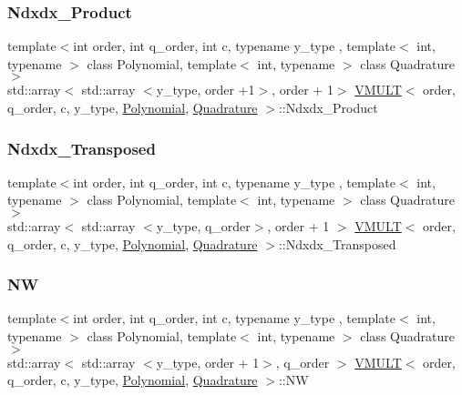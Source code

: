 \mbox{\label{class_v_m_u_l_t_a74d462b33c24fb447dc7267be3725720}} 
\subsubsection{\texorpdfstring{Ndxdx\+\_\+\+Product}{Ndxdx\_Product}}
{\footnotesize\ttfamily template$<$int order, int q\+\_\+order, int c, typename y\+\_\+type , template$<$ int, typename $>$ class Polynomial, template$<$ int, typename $>$ class Quadrature$>$ \\
std\+::array$<$ std\+::array $<$y\+\_\+type, order +1$>$, order + 1$>$ \hyperlink{class_v_m_u_l_t}{V\+M\+U\+LT}$<$ order, q\+\_\+order, c, y\+\_\+type, \hyperlink{class_polynomial}{Polynomial}, \hyperlink{class_quadrature}{Quadrature} $>$\+::Ndxdx\+\_\+\+Product}

\mbox{\label{class_v_m_u_l_t_a11fec13d3ecba614678ce07a466bdcb1}} 
\subsubsection{\texorpdfstring{Ndxdx\+\_\+\+Transposed}{Ndxdx\_Transposed}}
{\footnotesize\ttfamily template$<$int order, int q\+\_\+order, int c, typename y\+\_\+type , template$<$ int, typename $>$ class Polynomial, template$<$ int, typename $>$ class Quadrature$>$ \\
std\+::array$<$ std\+::array $<$y\+\_\+type, q\+\_\+order$>$, order + 1 $>$ \hyperlink{class_v_m_u_l_t}{V\+M\+U\+LT}$<$ order, q\+\_\+order, c, y\+\_\+type, \hyperlink{class_polynomial}{Polynomial}, \hyperlink{class_quadrature}{Quadrature} $>$\+::Ndxdx\+\_\+\+Transposed}

\mbox{\label{class_v_m_u_l_t_ad06ca1f3f261548524b59bd1a6dbe80d}} 
\subsubsection{\texorpdfstring{NW}{NW}}
{\footnotesize\ttfamily template$<$int order, int q\+\_\+order, int c, typename y\+\_\+type , template$<$ int, typename $>$ class Polynomial, template$<$ int, typename $>$ class Quadrature$>$ \\
std\+::array$<$ std\+::array $<$y\+\_\+type, order + 1$>$, q\+\_\+order $>$ \hyperlink{class_v_m_u_l_t}{V\+M\+U\+LT}$<$ order, q\+\_\+order, c, y\+\_\+type, \hyperlink{class_polynomial}{Polynomial}, \hyperlink{class_quadrature}{Quadrature} $>$\+::NW}


